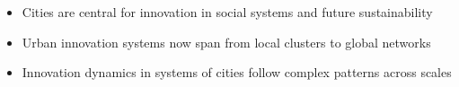 \documentclass[a0paper]{tikzposter}
\begin{document}
\begin{columns}
{%



          \vspace{0.35cm}
            
			\begin{itemize}
				\item Cities are central for innovation in social systems \cite{pumain2020theories} and future sustainability \cite{keith2022newshort}
                 \vspace{0.35cm}
				\item Urban innovation systems now span from local clusters to global networks
				\vspace{0.35cm}
				\item Innovation dynamics in systems of cities follow complex patterns across scales
				\vspace{0.35cm}
			\end{itemize}
		}
		

\end{columns}
\end{document}
